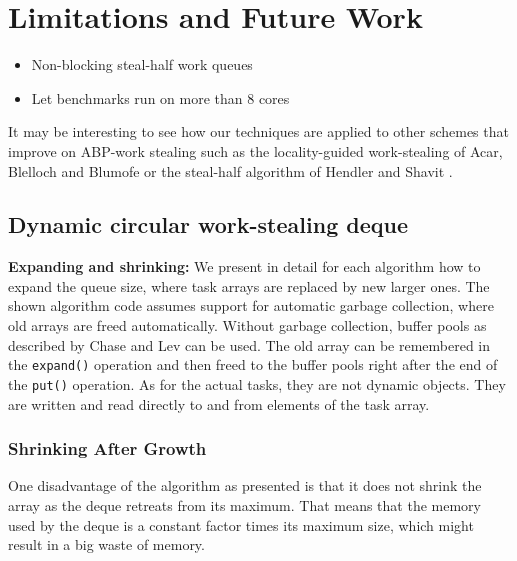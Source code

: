 \section{Limitations and Future Work}
\label{sec:queues-conclusion-future-work}


\begin{itemize}
\item Non-blocking steal-half work queues \cite{Hendler2002}
\item Let benchmarks run on more than 8 cores
\end{itemize}

It may be interesting to see how our techniques are applied to other
schemes that improve on ABP-work stealing such as the locality-guided
work-stealing of Acar, Blelloch and Blumofe \cite{Acar2002} or the
steal-half algorithm of Hendler and Shavit \cite{Hendler2002}.

\subsection{Dynamic circular work-stealing deque \cite{Chase2005}}

\textbf{Expanding and shrinking:} We present in detail for each
algorithm how to expand the queue size, where task arrays are replaced
by new larger ones. The shown algorithm code assumes support for
automatic garbage collection, where old arrays are freed
automatically. Without garbage collection, buffer pools as described
by Chase and Lev \cite{Chase2005} can be used. The old array can be
remembered in the \lstinline!expand()! operation and then freed to the
buffer pools right after the end of the \lstinline!put()!
operation. As for the actual tasks, they are not dynamic objects. They
are written and read directly to and from elements of the task array.

\subsubsection{Shrinking After Growth}

One disadvantage of the algorithm as presented is that it does not
shrink the array as the deque retreats from its maximum. That means
that the memory used by the deque is a constant factor times its
maximum size, which might result in a big waste of memory.

